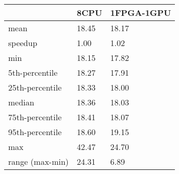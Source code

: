 \begin{tabular}{lll}
\toprule
 & 8CPU & 1FPGA-1GPU \\
\midrule
mean & 18.45 & 18.17 \\
speedup & 1.00 & 1.02 \\
min & 18.15 & 17.82 \\
5th-percentile & 18.27 & 17.91 \\
25th-percentile & 18.33 & 18.00 \\
median & 18.36 & 18.03 \\
75th-percentile & 18.41 & 18.07 \\
95th-percentile & 18.60 & 19.15 \\
max & 42.47 & 24.70 \\
range (max-min) & 24.31 & 6.89 \\
\bottomrule
\end{tabular}
